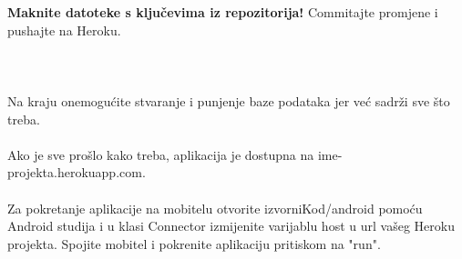 		\textbf{Maknite datoteke s ključevima iz repozitorija!}
		Commitajte promjene i pushajte na Heroku. \\
		 \\
		 \\
		 \\
		Na kraju onemogućite stvaranje i punjenje baze podataka jer već sadrži sve što treba. \\
		 \\
		Ako je sve prošlo kako treba, aplikacija je dostupna na ime-projekta.herokuapp.com.
		\\
		\\
		Za pokretanje aplikacije na mobitelu otvorite izvorniKod/android pomoću Android studija i u klasi Connector izmijenite varijablu host u url vašeg Heroku projekta. Spojite mobitel i pokrenite aplikaciju
		pritiskom na "run".
		
		
		
		\eject
			
